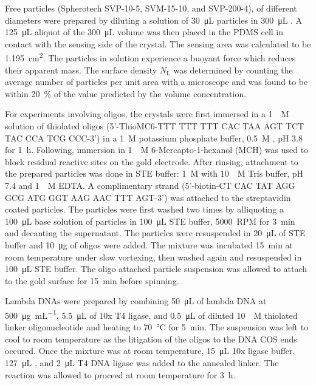 Free particles (Spherotech SVP-10-5, SVM-15-10, and SVP-200-4), of
different diameters were prepared by diluting a solution of
\SI{30}{\micro\liter} particles in \SI{300}{\micro\liter} .  A
\SI{125}{\micro\liter} aliquot of the \SI{300}{\micro\liter} volume was
then placed in the PDMS cell in contact with the sensing side of the
crystal.  The sensing area was calculated to be
\SI{1.195}{\centi\meter\squared}.  The particles in solution experience a
buoyant force which reduces their apparent mass. The surface density
$N_\mathrm{L}$ was determined by counting the average number of particles
per unit area with a microscope and was found to be within
\SI{20}{\percent} of the value predicted by the volume concentration.

For experiments involving oligos, the crystals were first immersed in a
\SI{1}{\micro\textsc{M}} solution of thiolated oligos (5'-ThioMC6-TTT TTT
TTT CAC TAA AGT TCT TAC CCA TCG CCC-3') in a \SI{1}{\textsc{M}} potassium
phosphate buffer, \SI{0.5}{\textsc{M}} , pH 3.8 for
\SI{1}{\hour}.  Following, immersion in \SI{1}{\milli\textsc{M}}
6-Mercapto-1-hexanol (MCH) was used to block residual reactive sites on the
gold electrode.  After rinsing, attachment to the prepared particles was
done in STE buffer: \SI{1}{\textsc{M}}  with
\SI{10}{\milli\textsc{M}} Tris buffer, pH 7.4 and \SI{1}{\milli\textsc{M}}
EDTA\@.  A complimentary strand (5'-biotin-CT CAC TAT AGG GCG ATG GGT AAG
AAC TTT AGT-3') was attached to the streptavidin coated particles.  The
particles were first washed two times by alliquoting a
\SI{100}{\micro\liter} base solution of particles in \SI{100}{\micro\liter}
STE buffer, \SI{5000}{RPM} for \SI{3}{\minute} and decanting the
supernatant.  The particles were resuspended in \SI{20}{\micro\liter} of
STE buffer and \SI{10}{\micro\gram} of oligos were added.  The mixture was
incubated \SI{15}{\minute} at room temperature under slow vortexing, then
washed again and resuspended in \SI{100}{\micro\liter} STE buffer.  The
oligo attached particle suspension was allowed to attach to the gold
surface for \SI{15}{\minute} before spinning.
 
Lambda DNAs were prepared by combining \SI{50}{\micro\liter} of lambda DNA
at \SI{500}{\micro\gram\per\milli\liter}, \SI{5.5}{\micro\liter} of 10x T4
ligase, and \SI{0.5}{\micro\liter} of diluted \SI{10}{\micro\textsc{M}}
thiolated linker oligonucleotide and heating to \SI{70}{\celsius} for
\SI{5}{\minute}.  The suspension was left to cool to room temperature as
the litigation of the oligos to the DNA COS ends occured. Once the mixture
was at room temperature, \SI{15}{\micro\liter} 10x ligase buffer,
\SI{127}{\micro\liter} , and \SI{2}{\micro\liter} T4 DNA ligase was
added to the annealed linker.  The reaction was allowed to proceed at room
temperature for \SI{3}{\hour}.

